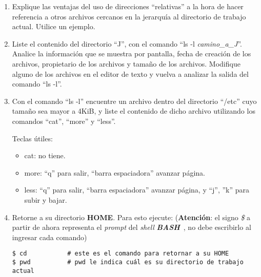 \documentclass[12pt]{article}
\newcommand{\bash}{\textbf{\emph{BASH}}\ }
\begin{document}
\begin{enumerate}
    \item Explique las ventajas del uso de direcciones ``relativas'' a la
            hora de hacer referencia a otros archivos cercanos en la jerarquía
            al directorio de trabajo actual. Utilice un ejemplo.

    \item Liste el contenido del directorio ``J'', con el comando ``ls -l
        \emph{camino\_a\_J}''.  Analice la información que se muestra por
        pantalla, fecha de creación de los archivos, propietario de los
        archivos y tamaño de los archivos. Modifique alguno de los archivos en
        el editor de texto y vuelva a analizar la salida del comando ``ls
        -l''.

    \item Con el comando ``ls -l'' encuentre un archivo dentro del directorio
        ``/etc'' cuyo tamaño sea mayor a 4KiB, y liste el contenido de dicho
        archivo utilizando los comandos ``cat'', ``more'' y ``less''.

    Teclas útiles:

    \begin{itemize}

        \itemsep2pt \parskip0pt 

        \item cat: no tiene.

        \item more: ``q'' para salir, ``barra espaciadora'' avanzar página.

        \item less: ``q'' para salir, ``barra espaciadora'' avanzar página, y
            ``j'', ''k'' para subir y bajar.

    \end{itemize}

    \item Retorne a su directorio \textbf{HOME}. Para esto ejecute:
        (\textbf{Atención}: el signo \emph{\$} a partir de ahora representa el
        \emph{prompt} del \emph{shell} \bash, no debe escribirlo al ingresar
        cada comando)

        \begin{verbatim}
$ cd           # este es el comando para retornar a su HOME
$ pwd          # pwd le indica cuál es su directorio de trabajo actual
        \end{verbatim}

\end{enumerate}
\end{document}
